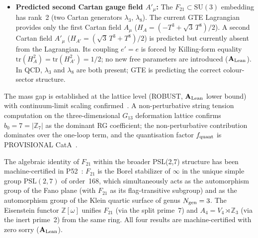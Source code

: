 \begin{itemize}[leftmargin=1.5em,itemsep=0.25em]
    Below $\Lambda_{\rm GTE} \approx 2$~GeV, the $F_{21}$ abelian gauge effective
    theory is the correct description.
    Above $\Lambda_{\rm GTE}$, $F_{21} \hookrightarrow \mathrm{SU}(3)$ faithfully
    ($\mathbf{A}_{\rm Lean}$: ); the Burnside density
    theorem establishes $\overline{\mathrm{span}}_\mathbb{C}\,\rho(F_{21}) =
    M_3(\mathbb{C})$, and $\Phi_{\rm MDL}$ scalar fluctuations fill the
    $\mathrm{SU}(3)/F_{21}$ coset, completing the UV theory as full SU(3)
    Yang--Mills.
    The na\"ive Wilsonian-flow approach from $F_{21}$ to $\mathrm{SU}(3)$ is
    falsified: the discrete $F_{21}$ lattice does not continuously flow to
    $\mathrm{SU}(3)$ in the IR; the UV completion is via Burnside density, not
    RG flow~\cite{SpivackGTEUnification}.
  \item \textbf{Predicted second Cartan gauge field $A'_\mu$:}
    The $F_{21} \subset \mathrm{SU}(3)$ embedding has rank~2 (two Cartan
    generators $\lambda_3$, $\lambda_8$).  The current GTE Lagrangian provides
    only the first Cartan field $A_\mu$ ($H_A = (-T^3 + \sqrt{3}\,T^8)/2$).
    A second Cartan field $A'_\mu$ ($H_{A'} = (\sqrt{3}\,T^3 + T^8)/2$) is
    predicted but currently absent from the Lagrangian.
    Its coupling $e' = e$ is forced by Killing-form equality
    $\mathrm{tr}(H_A^2) = \mathrm{tr}(H_{A'}^2) = 1/2$; no new free parameters
    are introduced ($\mathbf{A}_{\rm Lean}$).
    In QCD, $\lambda_3$ and $\lambda_8$ are both present; GTE is predicting the
    correct colour-sector structure.
\end{itemize}

The mass gap is established at the lattice level (ROBUST, $\mathbf{A}_{\rm Lean}$
lower bound) with continuum-limit scaling confirmed~\cite{SpivackEmergentGravity}.
A non-perturbative string tension computation on the three-dimensional $G_{13}$
deformation lattice confirms $b_0 = 7 = |\mathbb{Z}_7|$ as the dominant RG
coefficient; the non-perturbative contribution dominates over the one-loop term,
and the quantisation factor $f_{\rm quant}$ is PROVISIONAL CatA~\cite{SpivackGTEQCDStructure}.

The algebraic identity of $F_{21}$ within the broader PSL(2,7) structure has been
machine-certified in P52~\cite{SpivackPSL27Unification}: $F_{21}$ is the Borel
stabilizer of $\infty$ in the unique simple group $\mathrm{PSL}(2,7)$ of order~168,
which simultaneously acts as the automorphism group of the Fano plane (with $F_{21}$
as its flag-transitive subgroup) and as the automorphism group of the Klein quartic
surface of genus $N_{\rm gen} = 3$.
The Eisenstein functor $\mathbb{Z}[\omega]$ unifies $F_{21}$ (via the split prime~7)
and $A_4 = V_4 \rtimes \mathbb{Z}_3$ (via the inert prime~2) from the same ring.
All four results are machine-certified with zero sorry ($\textbf{A}_{\rm Lean}$).

